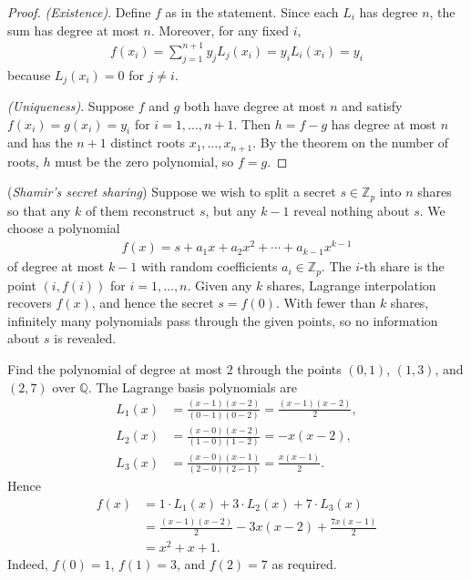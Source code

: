 \documentclass[a4paper, 12pt]{book} %
\begin{document}
\begin{proof}
    \emph{(Existence)}. Define $f$ as in the statement. Since each $L_i$ has degree $n$, the sum has degree at most $n$. Moreover, for any fixed $i$,
    \begin{align}
        f(x_i) = \sum_{j=1}^{n+1} y_j L_j(x_i) = y_i L_i(x_i) = y_i
    \end{align}
    because $L_j(x_i) = 0$ for $j \neq i$.
    
    \emph{(Uniqueness)}. Suppose $f$ and $g$ both have degree at most $n$ and satisfy $f(x_i) = g(x_i) = y_i$ for $i = 1, \ldots, n+1$. Then $h = f - g$ has degree at most $n$ and has the $n+1$ distinct roots $x_1, \ldots, x_{n+1}$. By the theorem on the number of roots, $h$ must be the zero polynomial, so $f = g$.
\end{proof}

\begin{example}
    (\emph{Shamir's secret sharing}) Suppose we wish to split a secret $s \in \mathbb{Z}_p$ into $n$ shares so that any $k$ of them reconstruct $s$, but any $k-1$ reveal nothing about $s$. We choose a polynomial
    \begin{align}
        f(x) = s + a_1 x + a_2 x^2 + \cdots + a_{k-1} x^{k-1}
    \end{align}
    of degree at most $k - 1$ with random coefficients $a_i \in \mathbb{Z}_p$. The $i$-th share is the point $(i, f(i))$ for $i = 1, \ldots, n$. Given any $k$ shares, Lagrange interpolation recovers $f(x)$, and hence the secret $s = f(0)$. With fewer than $k$ shares, infinitely many polynomials pass through the given points, so no information about $s$ is revealed.
\end{example}

\begin{example}
    Find the polynomial of degree at most 2 through the points $(0, 1)$, $(1, 3)$, and $(2, 7)$ over $\mathbb{Q}$. The Lagrange basis polynomials are
    \begin{align}
        L_1(x) &= \frac{(x-1)(x-2)}{(0-1)(0-2)} = \frac{(x-1)(x-2)}{2}, \\
        L_2(x) &= \frac{(x-0)(x-2)}{(1-0)(1-2)} = -x(x-2), \\
        L_3(x) &= \frac{(x-0)(x-1)}{(2-0)(2-1)} = \frac{x(x-1)}{2}.
    \end{align}
    Hence
    \begin{align}
        f(x) &= 1 \cdot L_1(x) + 3 \cdot L_2(x) + 7 \cdot L_3(x) \\
        &= \frac{(x-1)(x-2)}{2} - 3x(x-2) + \frac{7x(x-1)}{2} \\
        &= x^2 + x + 1.
    \end{align}
    Indeed, $f(0) = 1$, $f(1) = 3$, and $f(2) = 7$ as required.
\end{example}
\end{document}
